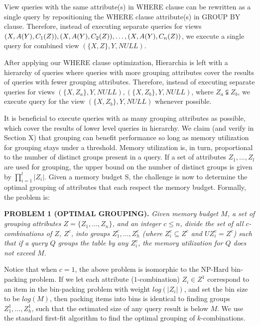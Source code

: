 View queries with the same attribute(s) in WHERE clause can be rewritten as a single query by repositioning the WHERE clause attribute(s) in GROUP BY clause. Therefore, instead of executing separate queries for views $(X, A(Y), C_1(Z)), (X, A(Y), C_2(Z)), \ldots, \\(X, A(Y), C_n(Z))$, we execute a single query for combined view $(\{X, Z\}, Y, NULL)$. 

After applying our WHERE clause optimization, Hierarchia is left with a hierarchy of queries where queries with more grouping attributes cover the results of queries with fewer grouping attributes. Therefore, instead of executing separate queries for views $(\{X, Z_a\}, Y, NULL), (\{X, Z_b\}, Y, NULL)$, where $Z_a \subsetneqq Z_b$, we execute query for the view $(\{X, Z_b\}, Y, NULL)$ whenever possible. 

It is beneficial to execute queries with as many grouping attributes as possible, which cover the results of lower level queries in hierarchy. We claim (and verify in Section X) that grouping can benefit performance so long as memory utilization for grouping stays under a threshold. Memory utilization is, in turn, proportional to the number of distinct groups present in a query. If a set of attributes $Z_1, \ldots, Z_l$ are used for grouping, the upper bound on the number of distinct groups is given by $\prod_{i=1}^{l}\lvert Z_i\rvert$. Given a memory budget S, the challenge is now to determine the optimal grouping of attributes that each respect the memory budget. Formally, the problem is:



\textbf{PROBLEM 1 (OPTIMAL GROUPING).} \emph{Given memory budget $M$, a set of grouping attributes $Z = \{Z_1, \ldots, Z_n\}$, and an integer $c \le n$, divide the set of all $c$-combinations of $Z$, $Z^c$, into groups $Z^c_1, \ldots, Z^c_h$ (where $Z^c_i \subseteq Z^c$ and $U Z^c_i = Z^c$) such that if a query $Q$ groups the table by any $Z^c_i$, the memory utilization for $Q$ does not exceed $M$.}

Notice that when $c = 1$, the above problem is isomorphic to the NP-Hard bin-packing problem. If we let each attribute ($1$-combination) $Z_i \in Z^1$ correspond to an item in the bin-packing problem with weight $log(\lvert Z_i\rvert)$, and set the bin size to be $log(M)$, then packing items into bins is identical to finding groups $Z^1_1, \ldots, Z^1_h$, such that the estimated size of any query result is below $M$. We use the standard first-fit algorithm to find the optimal grouping of $k$-combinations.

